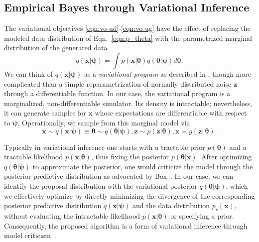 \documentclass[twocolumn,superscriptaddress,aps]{revtex4-1}
\newcommand{\qxpsi}{q(\mathbf{x}|\bfpsi)}
\newcommand{\bftheta}{{\bm \theta}}
\newcommand{\bfpsi}{{\bm \psi}}
\newcommand{\bfx}{\mathbf{x}}
\newcommand{\bfz}{\mathbf{z}}
\theoremstyle{plain}
\begin{document}
\subsection{Empirical Bayes through  Variational Inference}

The variational objectives \ref{eqn:vo-ud}-\ref{eqn:vo-ug}
have the effect of replacing the modeled data distribution of Eqn.~\ref{eqn:p_theta} with
the parametrized marginal distribution of the generated data
\begin{equation}
    \qxpsi = \int  p(\mathbf{x}|\bftheta) q(\bftheta|\bfpsi) d\bftheta.
\end{equation}
We can think of $q(\bfx|\bfpsi)$ as a \textit{variational program} as described
in \citep{2016arXiv161009033R}, though more complicated than a simple
reparametrization of normally distributed noise $\bfz$ through a differentiable
function. In our case, the variational program is a
marginalized, non-differentiable  simulator.  Its density is  intractable;
nevertheless, it can generate samples for $\bfx$ whose expectations are differentiable with
respect to $\bfpsi$.
Operationally, we sample from this marginal model via
\begin{equation}\label{eqn:p_psi}
    \mathbf{x} \sim \qxpsi \equiv \bftheta \sim q(\bftheta|\bfpsi), \bfz \sim p(\bfz|\bftheta), \mathbf{x} = g(\bfz; \bftheta).
\end{equation}


Typically in variational inference one starts with a tractable prior
$p(\bftheta)$ and a tractable likelihood $p(\bfx |\bftheta )$, thus fixing the
posterior $p(\bftheta | \bfx )$.   After optimizing $q(\bftheta | \bfpsi)$ to
approximate the posterior, one would criticize the model through the
posterior predictive distribution as advocated by Box~\citep{box1980sampling}.
In our case, we can identify the proposal distribution with the variational posterior
$q(\bftheta | \bfpsi)$, which we effectively optimize by
directly minimizing the  divergence of the corresponding posterior predictive
distribution $\qxpsi$ and the data distribution $p_r(\bfx)$, without evaluating
the intractable likelihood $p(\bfx | \bftheta )$ or specifying a prior.
Consequently, the proposed algorithm is a form of variational inference through
model criticism~\citep{box1980sampling}.
\end{document}
